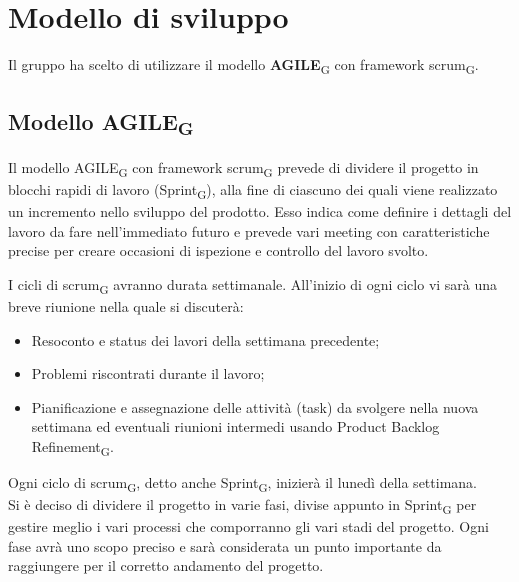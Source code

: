 \section{Modello di sviluppo}
Il gruppo ha scelto di utilizzare il modello \textbf{AGILE}\textsubscript{G} con framework scrum\textsubscript{G}.

\subsection{Modello AGILE\textsubscript{G}}
Il modello AGILE\textsubscript{G} con framework scrum\textsubscript{G} prevede di dividere il progetto in blocchi rapidi di lavoro (Sprint\textsubscript{G}),
alla fine di ciascuno dei quali viene realizzato un incremento nello sviluppo del prodotto. 
Esso indica come definire i dettagli del lavoro da fare nell'immediato futuro e prevede 
vari meeting con caratteristiche precise per creare occasioni di ispezione e controllo del lavoro svolto.

I cicli di scrum\textsubscript{G} avranno durata settimanale. All'inizio di ogni ciclo vi sarà una breve riunione nella quale si discuterà:
\begin{itemize}
	\item Resoconto e status dei lavori della settimana precedente;
	\item Problemi riscontrati durante il lavoro;
	\item Pianificazione e assegnazione delle attività (task) da svolgere nella nuova settimana ed eventuali riunioni intermedi usando Product Backlog Refinement\textsubscript{G}.
\end{itemize}
Ogni ciclo di scrum\textsubscript{G}, detto anche Sprint\textsubscript{G}, inizierà il lunedì della settimana.\\
Si è deciso di dividere il progetto in varie fasi, divise appunto in Sprint\textsubscript{G} per gestire meglio i vari processi che comporranno gli vari stadi del progetto. Ogni fase avrà uno scopo preciso e sarà considerata un punto importante da raggiungere per il corretto andamento del progetto.
